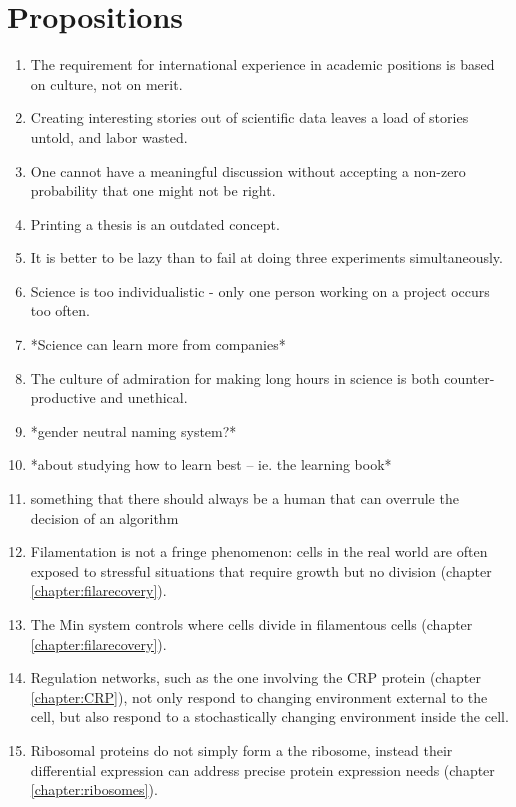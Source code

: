 



\chapter*{Propositions}

\begin{enumerate}
    \item The requirement for international experience in academic positions is based on culture, not on merit.
    \item Creating interesting stories out of scientific data leaves a load of stories untold, and labor wasted.    
    \item One cannot have a meaningful discussion without accepting a non-zero probability that one might not be right.
    \item Printing a thesis is an outdated concept.
    \item It is better to be lazy than to fail at doing three experiments simultaneously.
    \item Science is too individualistic - only one person working on a project occurs too often.
    \item *Science can learn more from companies*
    \item The culture of admiration for making long hours in science is both counter-productive and unethical.
    \item *gender neutral naming system?*
    \item *about studying how to learn best -- ie. the learning book*
    \item something that there should always be a human that can overrule the decision of an algorithm
    \item Filamentation is not a fringe phenomenon: cells in the real world are often exposed to stressful situations that require growth but no division (chapter \ref{chapter:filarecovery}).
    \item The Min system controls where cells divide in filamentous cells (chapter \ref{chapter:filarecovery}).
    \item Regulation networks, such as the one involving the CRP protein (chapter \ref{chapter:CRP}), not only respond to changing environment external to the cell, but also respond to a stochastically changing environment inside the cell.
    \item Ribosomal proteins do not simply form a the ribosome, instead their differential expression can address precise protein expression needs (chapter \ref{chapter:ribosomes}).
\end{enumerate}


